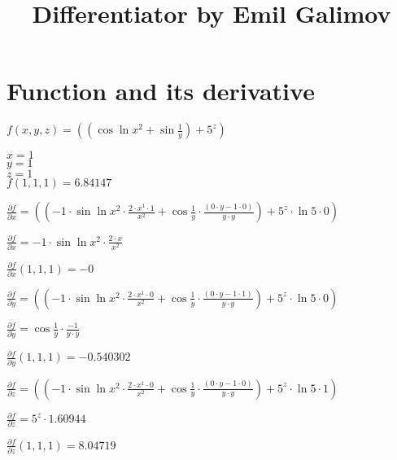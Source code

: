 \documentclass{article}
\title{Differentiator by Emil Galimov}
\begin{document}
\maketitle
\section{Function and its derivative}
\begin{center}
$f( x, y, z) = (( \cos{ \ln{x^{2}}}+ \sin{\frac{1}{y}})+5^{z})$\\
\end{center}
\begin{center}
$x = 1$\\ 
$y = 1$\\ 
$z = 1$\\ 
$f( 1, 1, 1) = 6.84147$
\end{center}
\begin{center}
$\frac{\partial f}{\partial x} = ((-1 \cdot  \sin{ \ln{x^{2}}} \cdot \frac{2 \cdot x^{1} \cdot 1}{x^{2}}+ \cos{\frac{1}{y}} \cdot \frac{(0 \cdot y-1 \cdot 0)}{y \cdot y})+5^{z} \cdot  \ln{5} \cdot 0)$\\
\end{center}
\begin{center}
$\frac{\partial f}{\partial x} = -1 \cdot  \sin{ \ln{x^{2}}} \cdot \frac{2 \cdot x}{x^{2}}$\\
\end{center}
\begin{center}
$\frac{\partial f}{\partial x}(1, 1, 1) = -0$\\
\end{center}
\begin{center}
$\frac{\partial f}{\partial y} = ((-1 \cdot  \sin{ \ln{x^{2}}} \cdot \frac{2 \cdot x^{1} \cdot 0}{x^{2}}+ \cos{\frac{1}{y}} \cdot \frac{(0 \cdot y-1 \cdot 1)}{y \cdot y})+5^{z} \cdot  \ln{5} \cdot 0)$\\
\end{center}
\begin{center}
$\frac{\partial f}{\partial y} =  \cos{\frac{1}{y}} \cdot \frac{-1}{y \cdot y}$\\
\end{center}
\begin{center}
$\frac{\partial f}{\partial y}(1, 1, 1) = -0.540302$\\
\end{center}
\begin{center}
$\frac{\partial f}{\partial z} = ((-1 \cdot  \sin{ \ln{x^{2}}} \cdot \frac{2 \cdot x^{1} \cdot 0}{x^{2}}+ \cos{\frac{1}{y}} \cdot \frac{(0 \cdot y-1 \cdot 0)}{y \cdot y})+5^{z} \cdot  \ln{5} \cdot 1)$\\
\end{center}
\begin{center}
$\frac{\partial f}{\partial z} = 5^{z} \cdot 1.60944$\\
\end{center}
\begin{center}
$\frac{\partial f}{\partial z}(1, 1, 1) = 8.04719$\\
\end{center}
\end{document}
